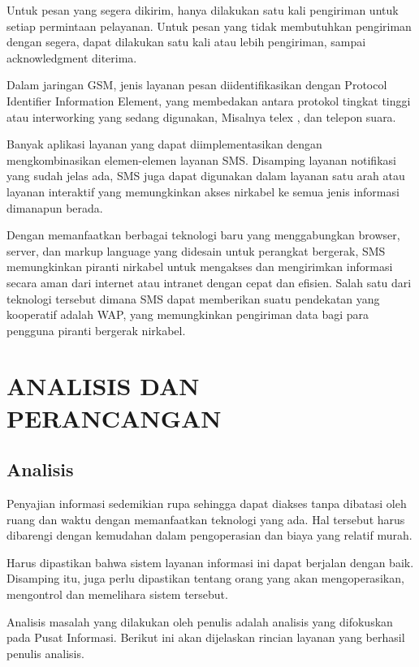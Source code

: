\documentclass{jtetiproposalskripsi}
\begin{document}
Untuk pesan yang segera dikirim, hanya dilakukan satu kali pengiriman untuk setiap permintaan pelayanan. Untuk pesan yang tidak membutuhkan pengiriman dengan segera, dapat dilakukan satu kali atau lebih pengiriman, sampai acknowledgment diterima.

Dalam jaringan GSM, jenis layanan pesan diidentifikasikan dengan Protocol Identifier Information Element, yang membedakan antara protokol tingkat tinggi atau interworking yang sedang digunakan, Misalnya telex , dan telepon suara.

Banyak aplikasi layanan yang dapat diimplementasikan dengan mengkombinasikan elemen-elemen layanan SMS. Disamping layanan notifikasi yang sudah jelas ada, SMS juga dapat digunakan dalam layanan satu arah atau layanan interaktif yang memungkinkan akses nirkabel ke semua jenis informasi dimanapun berada.

Dengan memanfaatkan berbagai teknologi baru yang menggabungkan browser, server, dan markup language yang didesain untuk perangkat bergerak, SMS memungkinkan piranti nirkabel untuk mengakses dan mengirimkan informasi secara aman dari internet atau intranet dengan cepat dan efisien. Salah satu dari teknologi tersebut dimana SMS dapat memberikan suatu pendekatan yang kooperatif adalah WAP, yang memungkinkan pengiriman data bagi para pengguna piranti bergerak nirkabel.

\chapter{ANALISIS DAN PERANCANGAN}

\section{Analisis}
Penyajian informasi sedemikian rupa sehingga dapat diakses tanpa dibatasi oleh ruang dan waktu dengan memanfaatkan teknologi yang ada. Hal tersebut harus dibarengi dengan kemudahan dalam pengoperasian dan biaya yang relatif murah.

Harus dipastikan bahwa sistem layanan informasi ini dapat berjalan dengan baik. Disamping itu, juga perlu dipastikan tentang orang yang akan mengoperasikan, mengontrol dan memelihara sistem tersebut.

Analisis masalah yang dilakukan oleh penulis adalah analisis yang difokuskan pada Pusat Informasi. Berikut ini akan dijelaskan rincian layanan yang berhasil penulis analisis.
\end{document}
